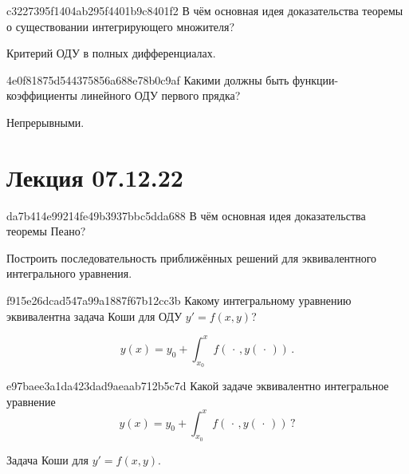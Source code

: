 \begin{note}{c3227395f1404ab295f4401b9c8401f2}
    В чём основная идея доказательства теоремы о существовании интегрирующего множителя?

    \begin{cloze}{1}
        Критерий ОДУ в полных дифференциалах.
    \end{cloze}
\end{note}

\begin{note}{4e0f81875d544375856a688e78b0c9af}
    Какими должны быть функции-коэффициенты линейного ОДУ первого прядка?

    \begin{cloze}{1}
        Непрерывными.
    \end{cloze}
\end{note}

\section{Лекция 07.12.22}
\begin{note}{da7b414e99214fe49b3937bbc5dda688}
    В чём основная идея доказательства теоремы Пеано?

    \begin{cloze}{1}
        Построить последовательность приближённых решений для эквивалентного интегрального уравнения.
    \end{cloze}
\end{note}

\begin{note}{f915e26dcad547a99a1887f67b12cc3b}
    Какому интегральному уравнению эквивалентна задача Коши для ОДУ \({ y' = f(x, y) }\)?

    \begin{cloze}{1}
        \[
            y(x) = y_0 + \int_{x_0}^{x} f(\,\cdot\,, y(\,\cdot\,))\,.
        \]
    \end{cloze}
\end{note}

\begin{note}{e97baee3a1da423dad9aeaab712b5c7d}
    Какой задаче эквивалентно интегральное уравнение
    \[
        y(x) = y_0 + \int_{x_0}^{x} f(\,\cdot\,, y(\,\cdot\,))\,?
    \]

    \begin{cloze}{1}
        Задача Коши для \({ y' = f(x, y) }\).
    \end{cloze}
\end{note}

